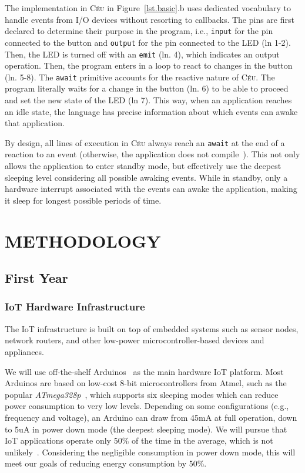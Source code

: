 \documentclass[12pt,english]{amsart}
\newcommand{\CEU}{\textsc{C\'{e}u}\xspace}
\newcommand{\code}[1] {{\small{\texttt{#1}}}}
\begin{document}
The implementation in \CEU in Figure~\ref{lst.basic}.b
uses dedicated vocabulary to handle events from I/O devices without resorting
to callbacks.
The pins are first declared to determine their purpose in the program, i.e.,
\code{input} for the pin connected to the button and  \code{output} for the pin
connected to the LED (ln 1-2).
Then, the LED is turned off with an \code{emit} (ln. 4), which indicates an
output operation.
Then, the program enters in a loop to react to changes in the button (ln. 5-8).
The \code{await} primitive accounts for the reactive nature of \CEU.
The program literally waits for a change in the button (ln. 6) to be able to
proceed and set the new state of the LED (ln 7).
%
This way, when an application reaches an idle state, the language has precise
information about which events can awake that application.

By design, all lines of execution in \CEU always reach an \code{await} at the
end of a reaction to an event (otherwise, the application does not
compile~\cite{ceu.sensys13}).
%
This not only allows the application to enter standby mode, but effectively use
the deepest sleeping level considering all possible awaking events.
While in standby, only a hardware interrupt associated with the events can
awake the application, making it sleep for longest possible periods of time.
%

\section{METHODOLOGY}

\subsection{First Year}
\label{sec.first}

\subsubsection{IoT Hardware Infrastructure}

The IoT infrastructure is built on top of embedded systems such as sensor
nodes, network routers, and other low-power microcontroller-based devices and
appliances.

We will use off-the-shelf Arduinos~\cite{arduino} as the main hardware IoT
platform.
Most Arduinos are based on low-cost 8-bit microcontrollers from Atmel, such as
the popular \emph{ATmega328p}~\cite{arduino.atmega328p},
which supports six sleeping
modes which can reduce power consumption to very low levels.
Depending on some configurations (e.g., frequency and voltage), an Arduino can
draw from 45mA at full operation, down to 5uA in power down mode (the deepest
sleeping mode).
We will pursue that IoT applications operate only 50\% of the time in the
average, which is not unlikely~\cite{wsn.tos.2}.
Considering the negligible consumption in power down mode, this will meet our
goals of reducing energy consumption by 50\%.
\end{document}
